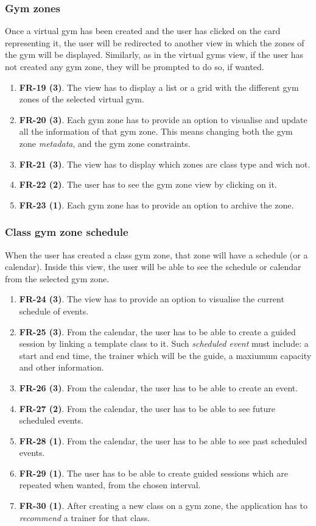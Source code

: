 \documentclass[a4paper, 12pt, oneside]{book}
\begin{document}
\subsubsection{Gym zones}
Once a virtual gym has been created and the user has clicked on the card representing it, the user will be redirected to another view in which the zones of the gym will be displayed. Similarly, as in the virtual gyms view, if the user has not created any gym zone, they will be prompted to do so, if wanted.
\begin{enumerate}[label = -]
	\item \textbf{FR-19 (3)}. The view has to display a list or a grid with the different gym zones of the selected virtual gym.
	\item \textbf{FR-20 (3)}. Each gym zone has to provide an option to visualise and update all the information of that gym zone. This means changing both the gym zone \emph{metadata}, and the gym zone constraints.
	\item \textbf{FR-21 (3)}. The view has to display which zones are class type and wich not.
	\item \textbf{FR-22 (2)}. The user has to see the gym zone view by clicking on it.
	\item \textbf{FR-23 (1)}. Each gym zone has to provide an option to archive the zone.
\end{enumerate}
\subsubsection{Class gym zone schedule}
When the user has created a class gym zone, that zone will have a schedule (or a calendar). Inside this view, the user will be able to see the schedule or calendar from the selected gym zone.
\begin{enumerate}[label = -]
	\item \textbf{FR-24 (3)}. The view has to provide an option to visualise the current schedule of events.
	\item \textbf{FR-25 (3)}. From the calendar, the user has to be able to create a guided session by linking a template class to it. Such \emph{scheduled event} must include: a start and end time, the trainer which will be the guide, a maxiumum capacity and other information.
	\item \textbf{FR-26 (3)}. From the calendar, the user has to be able to create an event.
	\item \textbf{FR-27 (2)}. From the calendar, the user has to be able to see future scheduled events.
	\item \textbf{FR-28 (1)}. From the calendar, the user has to be able to see past scheduled events.
	\item \textbf{FR-29 (1)}. The user has to be able to create guided sessions which are repeated when wanted, from the chosen interval.
	\item \textbf{FR-30 (1)}. After creating a new class on a gym zone, the application has to \emph{recommend} a trainer for that class.
\end{enumerate}
\end{document}
